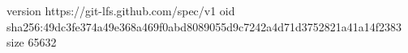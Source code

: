 version https://git-lfs.github.com/spec/v1
oid sha256:49dc3fe374a49e368a469f0abd8089055d9c7242a4d71d3752821a41a14f2383
size 65632
